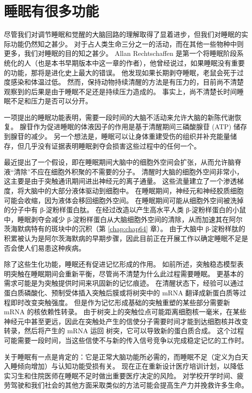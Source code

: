 \section{睡眠有很多功能}

尽管我们对调节睡眠和觉醒的大脑回路的理解取得了显着进步，但我们对睡眠的实际功能仍然知之甚少。
对于占人类生命三分之一的活动，而在其他一些物种中则更多，我们对睡眠的目的知之甚少。
Allan Rechtschaffen 是第一个将睡眠阶段系统化的人（也是本书早期版本中这一章的作者），他曾经说过，如果睡眠没有重要的功能，那将是进化史上最大的错误。
他发现如果长期剥夺睡眠，老鼠会死于过度感染和体温过低。
然而，保持动物持续清醒的方法是有压力的，目前尚不清楚观察到的后果是由于睡眠不足还是持续压力造成的。
事实上，尚不清楚长时间睡眠不足和压力是否可以分开。


一项提出的睡眠功能表明，需要一段时间的大脑不活动来允许大脑的新陈代谢恢复。
腺苷作为促进睡眠的体液因子的作用是基于清醒期间三磷酸腺苷 (ATP) 储存到腺苷的减少。
另一个想法是，睡眠可以让身体重建受伤的组织并补充能量储存，但几乎没有证据表明睡眠剥夺会损害这些过程中的任何一个。


最近提出了一个假设，即在睡眠期间大脑中的细胞外空间会扩张，从而允许脑脊液“清除”不应在细胞外积聚的不需要的分子。
清醒时大脑的细胞外空间非常小，这主要是由于突触通讯期间进出神经元的离子通量。
这些流量建立了一个渗透梯度，将大脑中的大部分液体驱动到细胞中。
在睡眠期间，神经元和神经胶质细胞可能会收缩，因为液体会移回细胞外空间。
在睡眠期间可能从细胞外空间被洗掉的分子中有 β-淀粉样蛋白肽。
在经过改造以产生高水平人类 β-淀粉样蛋白的小鼠中，睡眠剥夺会减少 β-淀粉样蛋白从大脑细胞外空间的清除，从而加速其在阿尔茨海默病特有的斑块中的沉积（第 \ref{chap:chap64} 章）。
由于大脑中 β-淀粉样肽的积累被认为是阿尔茨海默病的早期步骤，因此目前正在开展工作以确定睡眠不足是否会使人们易患这种疾病。


除了这些生化功能，睡眠还有促进记忆形成的作用。
如前所述，突触稳态模型表明突触在睡眠期间会重新平衡，尽管尚不清楚为什么此过程需要睡眠。
更基本的需求可能是为突触提供时间来巩固新的记忆痕迹。
在清醒状态下，经验可以通过蛋白质磷酸化、预制受体插入突触后膜或将树突中的 mRNA 翻译成新蛋白质等过程即时改变突触强度。
但是作为记忆形成基础的突触重塑的某些部分需要新 mRNA 的核依赖性转录。
由于树突上的突触位点可能距离细胞核一毫米，在某些神经元中甚至更远，因此在突触处产生的信使分子需要时间才能到达细胞核并改变转录，然后将产生的 mRNA 运回 树突，它可以导致新的蛋白质合成。
这个过程可能需要一段时间，当这些信使不与新的传入信号竞争以完成稳定记忆的工作时。


关于睡眠有一点是肯定的：它是正常大脑功能所必需的，而睡眠不足（定义为白天入睡倾向增加）与认知功能受损有关。
现在正在重新设计医疗培训计划，以降低实习生和住院医师在睡眠不足时做出重要医疗决定的风险。
对学校开学时间、疲劳驾驶和我们社会的其他方面采取类似的方法可能会提高生产力并挽救许多生命。


